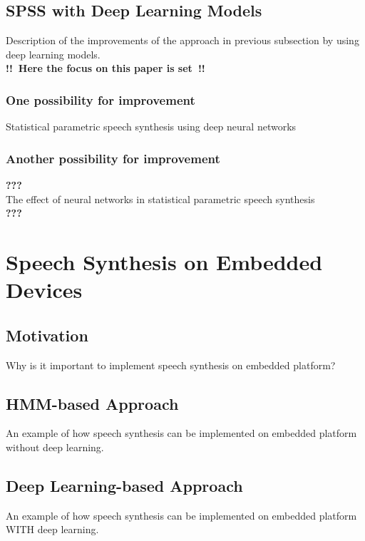 \subsection{\ac{SPSS} with Deep Learning Models}

Description of the improvements of the approach in previous subsection by using deep learning models. \\[0.5em]\textbf{!!~Here the focus on this paper is set~!!}

\subsubsection{One possibility for improvement}

Statistical parametric speech synthesis using deep neural networks \cite{zen:deepstatistical}

\subsubsection{Another possibility for improvement}

\textbf{???}\\
The effect of neural networks in statistical parametric speech synthesis \cite{hashimoto:effect}\\
\textbf{???}

\section{Speech Synthesis on Embedded Devices}
\label{sec:embeddedspeech}

\subsection{Motivation}

Why is it important to implement speech synthesis on embedded platform?

\subsection{\ac{HMM}-based Approach}

An example of how speech synthesis can be implemented on embedded platform without deep learning.

\subsection{Deep Learning-based Approach}

An example of how speech synthesis can be implemented on embedded platform WITH deep learning.

\clearpage